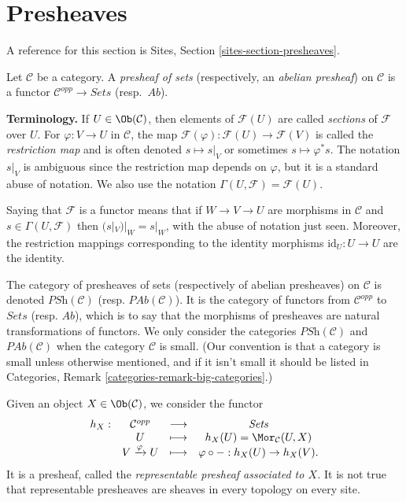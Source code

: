\section{Presheaves}
\label{section-presheaves}

\noindent
A reference for this section is
Sites, Section \ref{sites-section-presheaves}.

\begin{definition}
\label{definition-presheaf}
Let $\mathcal{C}$ be a category. A {\it presheaf of sets} (respectively, an
{\it abelian presheaf}) on $\mathcal{C}$ is a functor $\mathcal{C}^{opp} \to
\textit{Sets}$ (resp.\ $\textit{Ab}$).
\end{definition}

\noindent
{\bf Terminology.} If $U \in \Ob(\mathcal{C})$, then elements of
$\mathcal{F}(U)$ are called {\it sections} of $\mathcal{F}$ over
$U$. For $\varphi : V \to U$ in $\mathcal{C}$, the
map $\mathcal{F}(\varphi) : \mathcal{F}(U) \to \mathcal{F}(V)$
is called the {\it restriction map} and is often denoted $s \mapsto s|_V$
or sometimes $s \mapsto \varphi^*s$. The notation $s|_V$ is ambiguous
since the restriction map depends on $\varphi$, but it is a standard
abuse of notation. We also use the notation
$\Gamma(U, \mathcal{F}) = \mathcal{F}(U)$.

\medskip\noindent
Saying that $\mathcal{F}$ is a functor means that if
$W \to V \to U$ are morphisms in $\mathcal{C}$ and
$s \in \Gamma(U, \mathcal{F})$ then
$(s|_V)|_W = s |_W$, with the abuse of
notation just seen. Moreover, the restriction mappings corresponding to
the identity morphisms $\text{id}_U : U \to U$ are the identity.

\medskip\noindent
The category of presheaves of sets (respectively of abelian presheaves) on
$\mathcal{C}$ is denoted $\textit{PSh} (\mathcal{C})$ (resp. $\textit{PAb}
(\mathcal{C})$). It is the category of functors from $\mathcal{C}^{opp}$ to
$\textit{Sets}$ (resp. $\textit{Ab}$), which is to say that the morphisms of
presheaves are natural transformations of functors. We only consider the
categories $\textit{PSh}(\mathcal{C})$ and $\textit{PAb}(\mathcal{C})$
when the category $\mathcal{C}$ is small. (Our convention is that a category
is small unless otherwise mentioned, and if it isn't small it should be
listed in Categories, Remark \ref{categories-remark-big-categories}.)

\begin{example}
\label{example-representable-presheaf}
Given an object $X \in \Ob(\mathcal{C})$, we consider the functor
$$
\begin{matrix}
h_X : & \mathcal{C}^{opp} & \longrightarrow & \textit{Sets} \\
& U & \longmapsto & h_X(U) = \Mor_\mathcal{C}(U, X) \\
& V \xrightarrow{\varphi} U & \longmapsto &
\varphi \circ - : h_X(U) \to h_X(V).
\end{matrix}
$$
It is a presheaf, called the {\it representable presheaf associated to $X$.}
It is not true that representable presheaves are sheaves in every topology on
every site.
\end{example}

